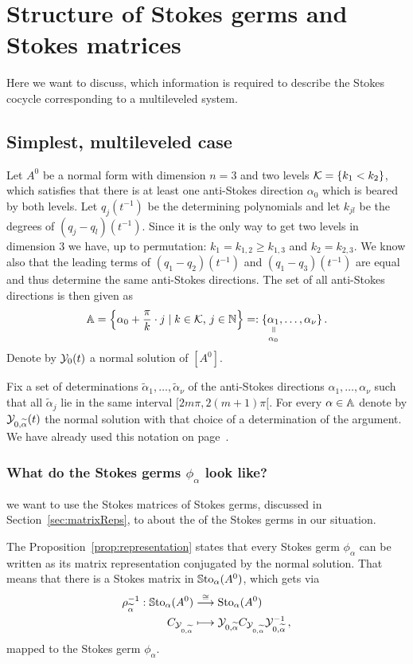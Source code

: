 \chapter{Structure of Stokes germs and Stokes
  matrices}\label{chp:WhichInformationIsNeeded}
Here we want to discuss, which information is required to describe the Stokes
cocycle corresponding to a multileveled system.
\section{Simplest, multileveled case}
Let $A^0$ be a normal form with dimension $n=3$ and two levels
$\mathcal{K}=\{k_1<k_2\}$, which satisfies that there is at least one anti-Stokes
direction $\alpha_0$ which is beared by both levels.
Let $q_j(t^{-1})$ be the determining polynomials and let $k_{jl}$ be the
degrees of $(q_j-q_l)(t^{-1})$.
Since it is the only way to get two levels in dimension $3$ we have, up to
permutation: $k_1=k_{1,2}\geq k_{1,3}$ and $k_2=k_{2,3}$.
We know also that the leading terms of $(q_1-q_2)(t^{-1})$ and
$(q_1-q_3)(t^{-1})$ are equal and thus determine the same anti-Stokes
directions.
The set of all anti-Stokes directions is then given as
\[
  \A=\left\{\alpha_0+\frac{\pi}{k}\cdot j\mid k\in\cK\text{, }j\in\N\right\}
    =:\{
      \underset{\alpha_0}{%
        \underset{\text{\rotatebox[origin=c]{-90}{$=$}}}{%
          \alpha_1
      }}
    ,\dots,\alpha_\nu\}\,.
\]
Denote by $\mathcal{Y}_0(t)$ a normal solution of $[A^0]$.

Fix a set of determinations $\tilde\alpha_1,\dots,\tilde\alpha_\nu$ of the
anti-Stokes directions $\alpha_1,\dots,\alpha_\nu$ such that all
$\tilde\alpha_j$ lie in the same interval $[2m\pi,2(m+1)\pi[$.
For every $\alpha\in\mathbb{A}$ denote by $\mathcal{Y}_{0,\widetilde\alpha}(t)$ the normal solution
with that choice of a determination of the argument. We have already used this
notation on page~\pageref{page:alreadyUsedDefn}.

\subsection{What do the Stokes germs $\phi_\alpha$ look like?}
 we want to use the Stokes matrices of Stokes germs, discussed
in Section~\ref{sec:matrixReps}, to  about the
 of the Stokes germs in our situation.

The Proposition~\ref{prop:representation} states that every Stokes germ
$\phi_\alpha$ can be written as its matrix representation conjugated by the
normal solution. That means that there is a Stokes matrix in
$\operatorname{\mathbb{S}to}_\alpha(A^0)$, which gets via
\begin{align*}
  \rho_{\widetilde\alpha}^{-1}:
  \operatorname{\mathbb{S}to}_\alpha(A^0)
  &\overset{\cong}\longrightarrow
  \operatorname{Sto}_\alpha(A^0)
  \\C_{\mathcal{Y}_{0,\widetilde\alpha}} &\longmapsto
  \mathcal{Y}_{0,\widetilde\alpha} C_{\mathcal{Y}_{0,\widetilde\alpha}} \mathcal{Y}_{0,\widetilde\alpha}^{-1} \,,
\end{align*}
mapped to the Stokes germ $\phi_\alpha$.

